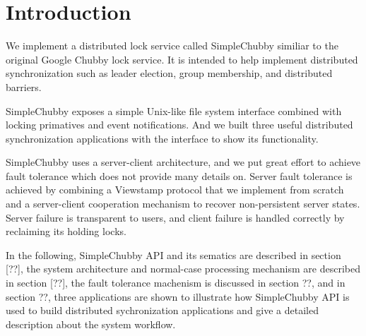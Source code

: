 \section{Introduction}

We implement a distributed lock service called SimpleChubby
similiar to the original Google Chubby lock service\cite{burrows2006chubby}.
It is intended to help implement distributed synchronization
such as leader election, group membership, and distributed barriers.

SimpleChubby exposes a simple Unix-like file system interface
combined with locking primatives and event notifications.
And we built three useful distributed synchronization applications with
the interface to show its functionality.

SimpleChubby uses a server-client architecture,
and we put great effort to achieve fault tolerance
which \cite{burrows2006chubby} does not provide many details on.
Server fault tolerance is achieved by combining a Viewstamp protocol
that we implement from scratch and a server-client cooperation mechanism
to recover non-persistent server states.
Server failure is transparent to users, and client failure
is handled correctly by reclaiming its holding locks.

In the following,
SimpleChubby API and its sematics are described in section [??],
the system architecture and normal-case processing mechanism
are described in section [??],
the fault tolerance machenism is discussed in section ??,
and in section ??, 
three applications are shown to illustrate
how SimpleChubby API is used to build 
distributed sychronization applications
and give a detailed description about the system workflow.
